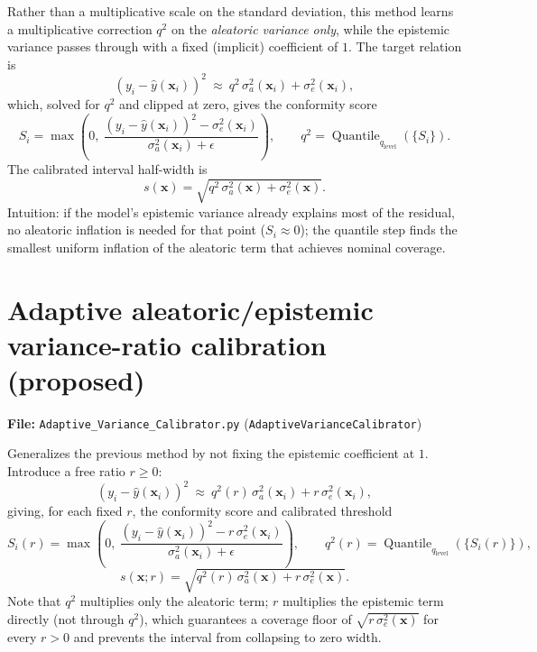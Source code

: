 \documentclass[11pt]{article}
\begin{document}
Rather than a multiplicative scale on the standard deviation, this method learns a multiplicative
correction $q^2$ on the \emph{aleatoric variance only}, while the epistemic variance passes through
with a fixed (implicit) coefficient of $1$. The target relation is
\begin{equation}
(y_i - \hat{y}(\bm{x}_i))^2 \ \approx\ q^2\,\sigma_a^2(\bm{x}_i) + \sigma_e^2(\bm{x}_i),
\end{equation}
which, solved for $q^2$ and clipped at zero, gives the conformity score
\begin{equation}
S_i = \max\!\left(0,\ \frac{(y_i - \hat{y}(\bm{x}_i))^2 -
\sigma_e^2(\bm{x}_i)}{\sigma_a^2(\bm{x}_i) + \epsilon}\right), \qquad
q^2 = \operatorname{Quantile}_{q_{\mathrm{level}}}(\{S_i\}).
\end{equation}
The calibrated interval half-width is
\begin{equation}
s(\bm{x}) = \sqrt{q^2\,\sigma_a^2(\bm{x}) + \sigma_e^2(\bm{x})}.
\end{equation}
Intuition: if the model's epistemic variance already explains most of the residual, no aleatoric
inflation is needed for that point ($S_i \approx 0$); the quantile step finds the smallest uniform
inflation of the aleatoric term that achieves nominal coverage.

\section{Adaptive aleatoric/epistemic variance-ratio calibration (proposed)}
\label{sec:adaptive-variance}
\textbf{File:} \texttt{Adaptive\_Variance\_Calibrator.py} (\texttt{AdaptiveVarianceCalibrator})

Generalizes the previous method by not fixing the epistemic coefficient at $1$. Introduce a free
ratio $r \ge 0$:
\begin{equation}
(y_i - \hat{y}(\bm{x}_i))^2 \ \approx\ q^2(r)\,\sigma_a^2(\bm{x}_i) + r\,\sigma_e^2(\bm{x}_i),
\end{equation}
giving, for each fixed $r$, the conformity score and calibrated threshold
\begin{equation}
S_i(r) = \max\!\left(0,\ \frac{(y_i - \hat{y}(\bm{x}_i))^2 -
r\,\sigma_e^2(\bm{x}_i)}{\sigma_a^2(\bm{x}_i) + \epsilon}\right), \qquad
q^2(r) = \operatorname{Quantile}_{q_{\mathrm{level}}}(\{S_i(r)\}),
\end{equation}
\begin{equation}
\label{eq:adaptive-halfwidth}
s(\bm{x}; r) = \sqrt{q^2(r)\,\sigma_a^2(\bm{x}) + r\,\sigma_e^2(\bm{x})}.
\end{equation}
Note that $q^2$ multiplies only the aleatoric term; $r$ multiplies the epistemic term directly (not
through $q^2$), which guarantees a coverage floor of $\sqrt{r\,\sigma_e^2(\bm{x})}$ for every $r>0$
and prevents the interval from collapsing to zero width.
\end{document}
